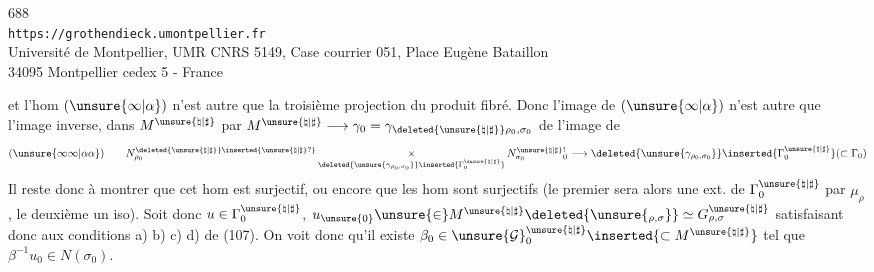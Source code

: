
\begin{center}
688\\
\texttt{https://grothendieck.umontpellier.fr}\\
Université de Montpellier, UMR CNRS 5149, Case courrier 051, Place Eugène Bataillon\\
34095 Montpellier cedex 5 - France
\end{center}



et l'hom $(\unsure{\infty|\alpha})$ n'est autre que la troisième projection du produit fibré.
Donc l'image de $(\unsure{\infty|\alpha})$ n'est autre que l'image inverse, dans $M^{\unsure{\natural|\sharp}}$ par $M^{\unsure{\natural|\sharp}}\longrightarrow\gamma_0=\gamma_{\deleted{\unsure{\natural|\sharp}}\rho_0,\sigma_0}$ de l'image de
\[
 (\unsure{\infty\infty|\alpha\alpha})\qquad
 N_{\rho_0}^{\deleted{\unsure{\natural|\sharp}}\inserted{\unsure{\natural|\sharp}?}}
 \mathop{\times}_{\deleted{\unsure{\gamma_{\rho_0,\sigma_0}}}\inserted{\Gamma_0^{\unsure{\natural|\sharp}}}}
 N_{\sigma_0}^{\unsure{\natural|\sharp}}{}_{0}^{!}
 \longrightarrow
 \deleted{\unsure{\gamma_{\rho_0,\sigma_0}}}\inserted{\Gamma_0^{\unsure{\natural|\sharp}}}
 (\subset\Gamma_0)
\]
Il reste donc à montrer que cet hom est surjectif, ou encore que les hom
sont surjectifs (le premier sera alors une ext. de $\Gamma_0^{\unsure{\natural|\sharp}}$ par $\mu_\rho$, le deuxième un iso). Soit donc $u\in\Gamma_0^{\unsure{\natural|\sharp}}$,  $u_{\unsure{0}}\unsure{\in}M^{\unsure{\natural|\sharp}}\deleted{\unsure{_{\rho,\sigma}}}\simeq G_{\rho,\sigma}^{\unsure{\natural|\sharp}}$ satisfaisant donc aux conditions a) b) c) d) de (107). On voit donc qu'il existe $\beta_0\in\unsure{\mathcal G}_0^{\unsure{\natural|\sharp}}\inserted{\subset M^{\unsure{\natural|\sharp}}}$ tel que $\beta^{-1}u_0\in N(\sigma_0)$.


